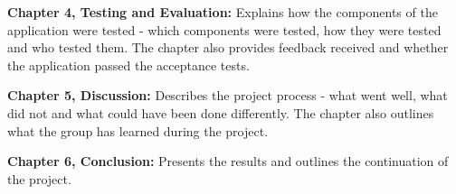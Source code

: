 \textbf{Chapter 4, Testing and Evaluation:}
Explains how the components of the application were tested - which components were tested, how they were tested and who tested them.
The chapter also provides feedback received and whether the application passed the acceptance tests.

\textbf{Chapter 5, Discussion:}
Describes the project process - what went well, what did not and what could have been done differently.
The chapter also outlines what the group has learned during the project.

\textbf{Chapter 6, Conclusion:}
Presents the results and outlines the continuation of the project.
